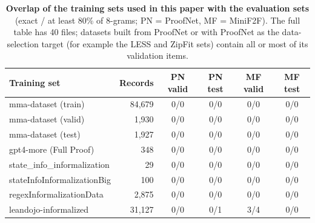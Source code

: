 \documentclass{article} %
\begin{document}
\begin{table}[ht]
\centering
\small
\begin{tabular}{|l|r|c|c|c|c|}
\hline
\textbf{Training set} & \textbf{Records} & \textbf{PN valid} & \textbf{PN test} & \textbf{MF valid} & \textbf{MF test} \\
\hline
mma-dataset (train) & 84,679 & 0/0 & 0/0 & 0/0 & 0/0 \\
mma-dataset (valid) & 1,930 & 0/0 & 0/0 & 0/0 & 0/0 \\
mma-dataset (test) & 1,927 & 0/0 & 0/0 & 0/0 & 0/0 \\
gpt4-more (Full Proof) & 348 & 0/0 & 0/0 & 0/0 & 0/0 \\
state\_info\_informalization & 29 & 0/0 & 0/0 & 0/0 & 0/0 \\
stateInfoInformalizationBig & 100 & 0/0 & 0/0 & 0/0 & 0/0 \\
regexInformalizationData & 2,875 & 0/0 & 0/0 & 0/0 & 0/0 \\
leandojo-informalized & 31,127 & 0/0 & 0/1 & 3/4 & 0/0 \\
\hline
\end{tabular}
\caption{\textbf{Overlap of the training sets used in this paper with the evaluation sets} (exact / at least 80\% of 8-grams; PN = ProofNet, MF = MiniF2F). The full table has 40 files; datasets built from ProofNet or with ProofNet as the data-selection target (for example the LESS and ZipFit sets) contain all or most of its validation items.}
\label{table:contamination}
\end{table}
\end{document}
